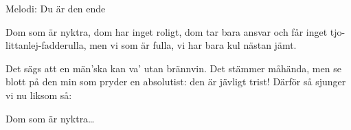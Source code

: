 \begin{song}
\begin{songmeta}
Melodi: Du är den ende
\end{songmeta}

\begin{songtext}
Dom som är nyktra,
dom har inget roligt,
dom tar bara ansvar
och får inget tjo-
littanlej-fadderulla,
men vi som är fulla,
vi har bara kul nästan jämt.

Det sägs att en män'ska
kan va' utan brännvin.
Det stämmer måhända,
men se blott på den min
som pryder en absolutist:
den är jävligt trist!
Därför så sjunger vi
nu liksom så:

Dom som är nyktra\ldots
\end{songtext}
\end{song}
